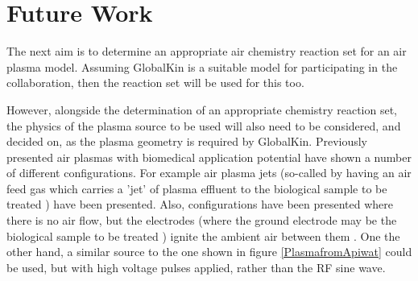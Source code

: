 \documentclass[11pt, oneside]{article}   	%
\begin{document}
\section{Future Work}

The next aim is to determine an appropriate air chemistry reaction set for an air plasma model.
Assuming GlobalKin is a suitable model for participating in the collaboration, then the reaction set will be used for this too.

However, alongside the determination of an appropriate chemistry reaction set, the physics of the plasma source to be used will also need to be considered, and decided on, as the plasma geometry is required by GlobalKin.
Previously presented air plasmas with biomedical application potential have shown a number of different configurations.
For example air plasma jets (so-called by having an air feed gas which carries a 'jet' of plasma effluent to the biological sample to be treated \cite{Kolb2008cold, Chen2009blood}) have been presented.
Also, configurations have been presented where there is no air flow, but the electrodes (where the ground electrode may be the biological sample to be treated \cite{Fridman2007floating}) ignite the ambient air between them \cite{Laroussi2004evaluation}. 
One the other hand, a similar source to the one shown in figure \ref{PlasmafromApiwat} could be used, but with high voltage pulses applied, rather than the RF sine wave.


%
\end{document}
